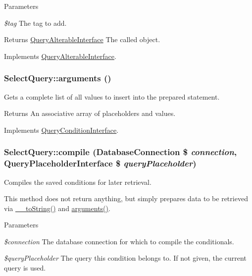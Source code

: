\begin{DoxyParams}{Parameters}
\item[{\em \$tag}]The tag to add.\end{DoxyParams}
\begin{DoxyReturn}{Returns}
\hyperlink{interfaceQueryAlterableInterface}{QueryAlterableInterface} The called object. 
\end{DoxyReturn}


Implements \hyperlink{interfaceQueryAlterableInterface_a86b5a64d7b1b34959666e9d5eada3940}{QueryAlterableInterface}.\hypertarget{classSelectQuery_ada38099d692203d261f6a6b708a9635c}{
\subsubsection[{arguments}]{\setlength{\rightskip}{0pt plus 5cm}SelectQuery::arguments ()}}
\label{classSelectQuery_ada38099d692203d261f6a6b708a9635c}
Gets a complete list of all values to insert into the prepared statement.

\begin{DoxyReturn}{Returns}
An associative array of placeholders and values. 
\end{DoxyReturn}


Implements \hyperlink{interfaceQueryConditionInterface_ac2349e02d5332412182cf472ba1a1b1e}{QueryConditionInterface}.\hypertarget{classSelectQuery_ad858d64a89ca6b8d60f135470d40319f}{
\subsubsection[{compile}]{\setlength{\rightskip}{0pt plus 5cm}SelectQuery::compile ({\bf DatabaseConnection} \$ {\em connection}, \/  {\bf QueryPlaceholderInterface} \$ {\em queryPlaceholder})}}
\label{classSelectQuery_ad858d64a89ca6b8d60f135470d40319f}
Compiles the saved conditions for later retrieval.

This method does not return anything, but simply prepares data to be retrieved via \hyperlink{classSelectQuery_ae5b1bbcecaf13957de15eb49584195b3}{\_\-\_\-toString()} and \hyperlink{classSelectQuery_ada38099d692203d261f6a6b708a9635c}{arguments()}.


\begin{DoxyParams}{Parameters}
\item[{\em \$connection}]The database connection for which to compile the conditionals. \item[{\em \$queryPlaceholder}]The query this condition belongs to. If not given, the current query is used. \end{DoxyParams}


